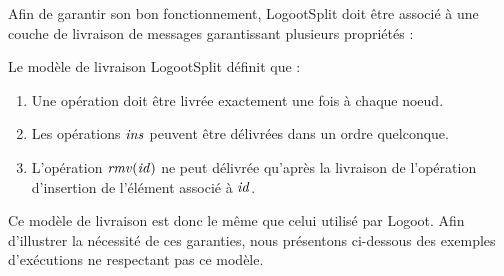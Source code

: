\label{sec:logootsplit-delivery-model}

Afin de garantir son bon fonctionnement, LogootSplit doit être associé à une couche de livraison de messages garantissant plusieurs propriétés :

\begin{definition}
    Le modèle de livraison LogootSplit définit que :
    \begin{enumerate}
      \item Une opération doit être livrée exactement une fois à chaque noeud.
      \item Les opérations $\mathit{ins}$ peuvent être délivrées dans un ordre quelconque.
      \item L'opération $\mathit{rmv}(\mathit{id})$ ne peut délivrée qu'après la livraison de l'opération d'insertion de l'élément associé à $\mathit{id}$.
    \end{enumerate}
\end{definition}

Ce modèle de livraison est donc le même que celui utilisé par Logoot.
Afin d'illustrer la nécessité de ces garanties, nous présentons ci-dessous des exemples d'exécutions ne respectant pas ce modèle.
